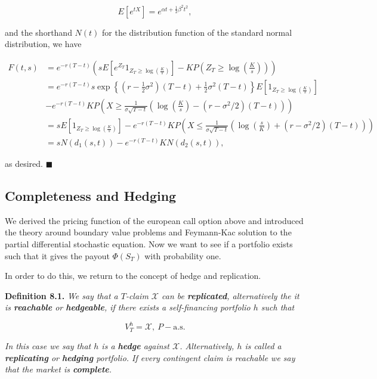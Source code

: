 \documentclass[
]{article}
\begin{document}
\[
E[e^{tX}]=e^{\alpha t+\frac{1}{2}\beta ^2t^2},
\]

and the shorthand \(N(t)\) for the distribution function of the standard
normal distribution, we have

\begin{align*}
F(t,s)&=e^{-r(T-t)}\left(sE\left[e^{Z_T}1_{Z_T\ge \log\left(\frac{K}{s}\right)}\right]-K P\left(Z_T\ge \log\left(\frac{K}{s}\right)\right)\right)\\
&=e^{-r(T-t)}s\exp\left\{\left(r-\frac{1}{2}\sigma^2\right)(T-t)+\frac{1}{2}\sigma^2(T-t)\right\}E\left[1_{Z_T\ge \log\left(\frac{K}{s}\right)}\right]\\
&-e^{-r(T-t)}K P\left(X\ge\frac{1}{\sigma\sqrt{T-t}}\left( \log\left(\frac{K}{s}\right)-(r-\sigma^2/2)(T-t)\right)\right)\\
&=sE\left[1_{Z_T\ge \log\left(\frac{K}{s}\right)}\right]-e^{-r(T-t)}K P\left(X\le\frac{1}{\sigma\sqrt{T-t}}\left(\log\left(\frac{s}{K}\right)+(r-\sigma^2/2)(T-t)\right)\right)\\
&=sN(d_1(s,t))-e^{-r(T-t)}K N\left(d_2(s,t)\right),
\end{align*}

as desired. \(\blacksquare\)

\hypertarget{completeness-and-hedging}{%
\subsection{Completeness and Hedging}\label{completeness-and-hedging}}

We derived the pricing function of the european call option above and
introduced the theory around boundary value problems and Feymann-Kac
solution to the partial differential stochastic equation. Now we want to
see if a portfolio exists such that it gives the payout \(\Phi(S_T)\)
with probability one.

In order to do this, we return to the concept of hedge and replication.

\textbf{Definition 8.1.} \emph{We say that a \(T\)-claim \(\mathcal{X}\)
can be \textbf{replicated}, alternatively the it is \textbf{reachable}
or \textbf{hedgeable}, if there exists a self-financing portfolio \(h\)
such that}

\[
V_T^h=\mathcal{X},\ P-\text{a.s.}\tag{8.1}
\]

\emph{In this case we say that \(h\) is a \textbf{hedge} against
\(\mathcal{X}\). Alternatively, \(h\) is called a \textbf{replicating}
or \textbf{hedging} portfolio. If every contingent claim is reachable we
say that the market is \textbf{complete}.}
\end{document}
